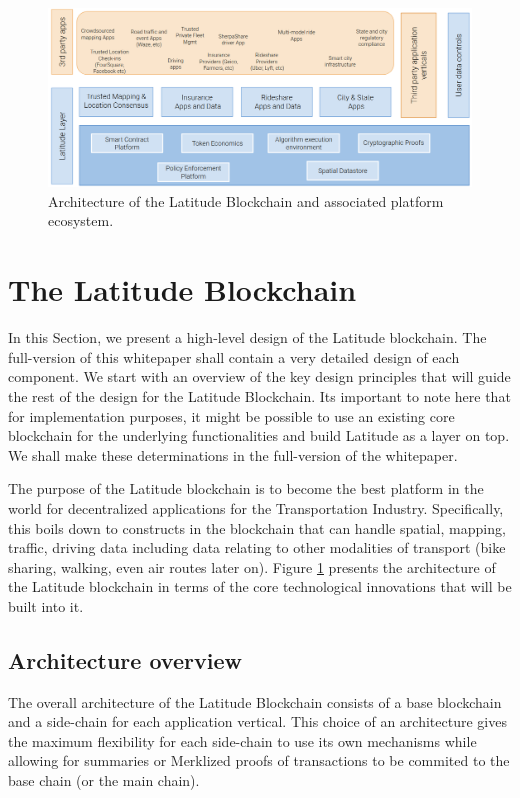\begin{figure}[t]
    \centering
    \includegraphics[width=1.00\textwidth]{latarch.png}
  \caption{Architecture of the Latitude Blockchain and associated platform ecosystem.}
    \label{fig:lat-arch}
\end{figure}

\section{The Latitude Blockchain}\label{sec:design}

In this Section, we present a high-level design of the Latitude blockchain. The full-version of this whitepaper shall
contain a very detailed design of each component. We start with an overview of the key design principles that will guide
the rest of the design for the Latitude Blockchain. Its important to note here that for implementation purposes, it
might be possible to use an existing core blockchain for the underlying functionalities and build Latitude as a layer on
top. We shall make these determinations in the full-version of the whitepaper.

The purpose of the Latitude blockchain is to become the best platform in the world for decentralized applications for
the Transportation Industry. Specifically, this boils down to constructs in the blockchain that can handle spatial,
mapping, traffic, driving data including data relating to other modalities of transport (bike sharing, walking, even air
routes later on). Figure \ref{fig:lat-arch} presents the architecture of the Latitude blockchain in terms of the core
technological innovations that will be built into it.

\subsection{Architecture overview}

The overall architecture of the Latitude Blockchain consists of a base blockchain and a side-chain for each application
vertical. This choice of an architecture gives the maximum flexibility for each side-chain to use its own mechanisms
while allowing for summaries or Merklized proofs of transactions to be commited to the base chain (or the main chain).



